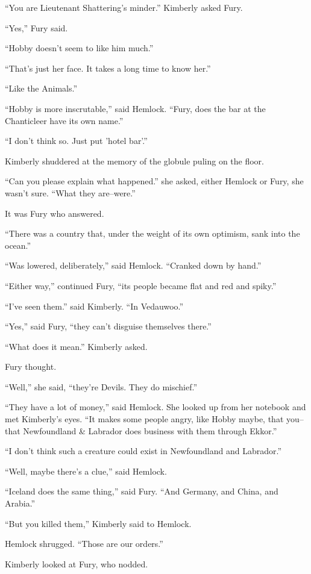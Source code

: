\documentclass[11pt,a5paper]{article}
\begin{document}
``You are Lieutenant Shattering's minder.'' Kimberly asked Fury.

``Yes,'' Fury said.

``Hobby doesn't seem to like him much.''

``That's just her face. It takes a long time to know her.''

``Like the Animals.''

``Hobby is more inscrutable,'' said Hemlock. ``Fury, does the bar at the Chanticleer have its own name.''

``I don't think so. Just put 'hotel bar'.''

Kimberly shuddered at the memory of the globule puling on the floor.

``Can you please explain what happened.'' she asked, either Hemlock or Fury, she wasn't sure. ``What they are--were.''

It was Fury who answered.

``There was a country that, under the weight of its own optimism, sank into the ocean.''

``Was lowered, deliberately,'' said Hemlock. ``Cranked down by hand.''

``Either way,'' continued Fury, ``its people became flat and red and spiky.''

``I've seen them.'' said Kimberly. ``In Vedauwoo.''

``Yes,'' said Fury, ``they can't disguise themselves there.''

``What does it mean.'' Kimberly asked.

Fury thought.

``Well,'' she said, ``they're Devils. They do mischief.''

``They have a lot of money,'' said Hemlock. She looked up from her notebook and met Kimberly's eyes. ``It makes some people angry, like Hobby maybe, that you--that Newfoundland \& Labrador does business with them through Ekkor.''

``I don't think such a creature could exist in Newfoundland and Labrador.''

``Well, maybe there's a clue,'' said Hemlock.

``Iceland does the same thing,'' said Fury. ``And Germany, and China, and Arabia.''

``But you killed them,'' Kimberly said to Hemlock.

Hemlock shrugged. ``Those are our orders.''

Kimberly looked at Fury, who nodded.
\end{document}
